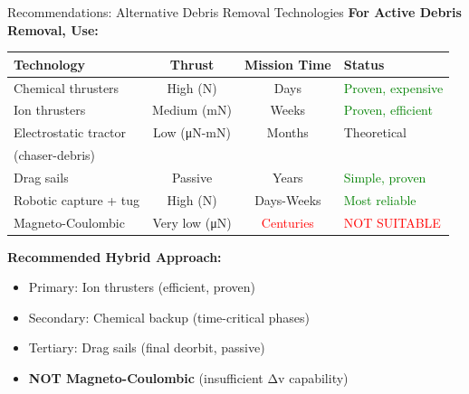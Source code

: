 \documentclass[aspectratio=169]{beamer}
\begin{document}
\begin{frame}{Recommendations: Alternative Debris Removal Technologies}
\textbf{For Active Debris Removal, Use:}

\vspace{0.5em}
\begin{table}
\footnotesize
\begin{tabular}{lccl}
\toprule
\textbf{Technology} & \textbf{Thrust} & \textbf{Mission Time} & \textbf{Status} \\
\midrule
Chemical thrusters & High (N) & Days & \textcolor{green}{Proven, expensive} \\
Ion thrusters & Medium (mN) & Weeks & \textcolor{green}{Proven, efficient} \\
Electrostatic tractor & Low (μN-mN) & Months & Theoretical \\
  (chaser-debris) & & & \\
Drag sails & Passive & Years & \textcolor{green}{Simple, proven} \\
Robotic capture + tug & High (N) & Days-Weeks & \textcolor{green}{Most reliable} \\
\midrule
Magneto-Coulombic & Very low (μN) & \textcolor{red}{Centuries} & \textcolor{red}{NOT SUITABLE} \\
\bottomrule
\end{tabular}
\end{table}

\vspace{1em}
\textbf{Recommended Hybrid Approach:}
\begin{itemize}
    \item Primary: Ion thrusters (efficient, proven)
    \item Secondary: Chemical backup (time-critical phases)
    \item Tertiary: Drag sails (final deorbit, passive)
    \item \textbf{NOT Magneto-Coulombic} (insufficient Δv capability)
\end{itemize}
\end{frame}
\end{document}
